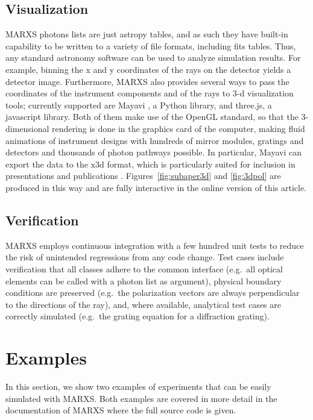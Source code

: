 \documentclass[twocolumn]{aastex61}
\begin{document}
\subsection{Visualization}
MARXS photons lists are just astropy tables, and as such they have built-in
capability to be written to a variety of file formats, including fits
tables. Thus, any standard astronomy software can be used to analyze simulation
results. For example, binning the x and y coordinates of the rays on the
detector yields a detector image. Furthermore, MARXS also provides several ways
to pass the coordinates of the instrument components and of the rays to 3-d
visualization tools; currently supported are Mayavi \citep{mayavi}, a Python
library, and three.js, a javascript library. Both of them make use of the
OpenGL standard, so that the 3-dimensional rendering is done in the graphics
card of the computer, making fluid animations of instrument designs with
hundreds of mirror modules, gratings and detectors and thousands of photon
pathways possible. In particular, Mayavi can export the data to the x3d format,
which is particularly suited for inclusion in presentations and publications
\citep{2016ApJ...818..115V}. Figures~\ref{fig:subaper3d} and \ref{fig:3dpol}
are produced in this way and are fully interactive in the online version of
this article.

\subsection{Verification}
MARXS employs continuous integration with a few hundred unit tests to reduce
the risk of unintended regressions from any code change. Test cases include
verification that all classes adhere to the common interface (e.g.\ all optical
elements can be called with a photon list as argument), physical boundary
conditions are preserved (e.g.\ the polarization vectors are always
perpendicular to the directions of the ray), and, where available, analytical
test cases are correctly simulated (e.g.\ the grating equation for a
diffraction grating).

\section{Examples}
\label{sect:example}
In this section, we show two examples of experiments that can be easily simulated  with MARXS. Both examples are covered in more detail in the documentation of MARXS where the full source code is given.
\end{document}
